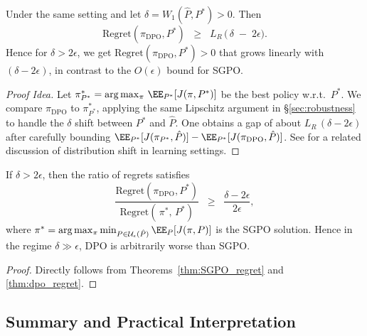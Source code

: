 \begin{theorem}
\label{thm:dpo_regret}
Under the same setting and let $\delta = W_1(\hat{P},P^*) > 0$.  Then
\[
\text{Regret}(\pi_{\text{DPO}},P^*)
\;\;\ge\;\;
L_{R}\,\bigl(\,\delta \;-\;2\epsilon\bigr).
\]
Hence for $\delta>2\epsilon$, we get $\text{Regret}(\pi_{\text{DPO}},P^*)>0$ that grows linearly with $(\delta-2\epsilon)$, in contrast to the $O(\epsilon)$ bound for SGPO.
\end{theorem}

\begin{proof}[Proof Idea]
Let $\pi^*_{P^*}=\arg\max_{\pi}\,\EE_{P^*}[J(\pi,P^*)]$ be the best policy w.r.t.\ $P^*$.  We compare $\pi_{\text{DPO}}$ to $\pi^*_{P^*}$, applying the same Lipschitz argument in \S\ref{sec:robustness} to handle the $\delta$ shift between $P^*$ and $\hat{P}$.  One obtains a gap of about $L_R\,(\delta - 2\epsilon)$ after carefully bounding $\EE_{P^*}[J(\pi_{P^*},\hat{P})] - \EE_{P^*}[J(\pi_{\text{DPO}},\hat{P})]$.  See \cite{shalev2014understanding} for a related discussion of distribution shift in learning settings.
\end{proof}

\begin{corollary}
\label{thm:dpo_suboptimal}
If $\delta > 2\epsilon$, then the ratio of regrets satisfies
\[
\frac{\text{Regret}(\pi_{\text{DPO}},P^*)}
     {\text{Regret}(\,\pi^*,\,P^*)}
\;\;\ge\;\;
\frac{\delta - 2\epsilon}{\,2\epsilon\,},
\]
where $\pi^*=\arg\max_{\pi}\min_{P\in \mathcal{U}_\epsilon(\hat{P})}\EE_{P}[J(\pi,P)]$ is the SGPO solution.  
Hence in the regime $\delta \gg \epsilon$, DPO is arbitrarily worse than SGPO.
\end{corollary}

\begin{proof}
Directly follows from Theorems~\ref{thm:SGPO_regret} and \ref{thm:dpo_regret}.
\end{proof}

\subsection{Summary and Practical Interpretation}

